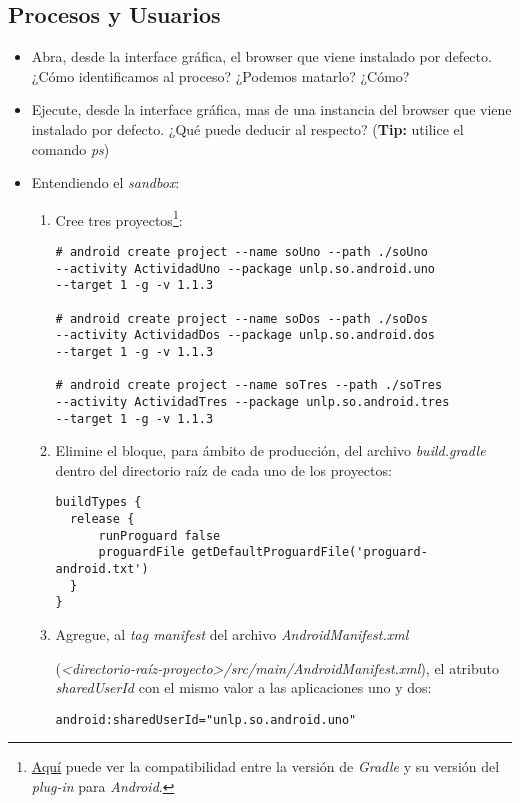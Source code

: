 \subsection{Procesos y Usuarios}
\begin{itemize}
    \item Abra, desde la interface gráfica, el browser que viene instalado por defecto. ¿Cómo identificamos al proceso? ¿Podemos matarlo? ¿Cómo?
    
    \item Ejecute, desde la interface gráfica, mas de una instancia del browser que viene instalado por defecto. ¿Qué puede deducir al respecto? (\textbf{Tip:} utilice el comando \textit{ps})
    
    \item Entendiendo el \textit{sandbox}:
    \begin{enumerate}
    \item Cree tres proyectos\footnote{\href{http://tools.android.com/tech-docs/new-build-system/version-compatibility}{Aquí} puede ver la compatibilidad entre la versión de \textit{Gradle} y su versión del \textit{plug-in} para \textit{Android}.}:
    \begin{lstlisting}
# android create project --name soUno --path ./soUno 
--activity ActividadUno --package unlp.so.android.uno 
--target 1 -g -v 1.1.3

# android create project --name soDos --path ./soDos 
--activity ActividadDos --package unlp.so.android.dos 
--target 1 -g -v 1.1.3

# android create project --name soTres --path ./soTres 
--activity ActividadTres --package unlp.so.android.tres 
--target 1 -g -v 1.1.3
    \end{lstlisting}
    
    \item Elimine el bloque, para ámbito de producción, del archivo \textit{build.gradle} dentro del directorio raíz de cada uno de los proyectos:
    \begin{lstlisting}
buildTypes {
  release {
      runProguard false
      proguardFile getDefaultProguardFile('proguard-android.txt')
  }
}
    \end{lstlisting}
    
    \item Agregue, al \textit{tag manifest} del archivo \textit{AndroidManifest.xml} 
    
    (\emph{<directorio-raíz-proyecto>/src/main/AndroidManifest.xml}), el atributo \textit{sharedUserId} con el mismo valor a las aplicaciones uno y dos:
    \begin{lstlisting}
android:sharedUserId="unlp.so.android.uno"
    \end{lstlisting}
    

\end{enumerate}
\end{itemize}
